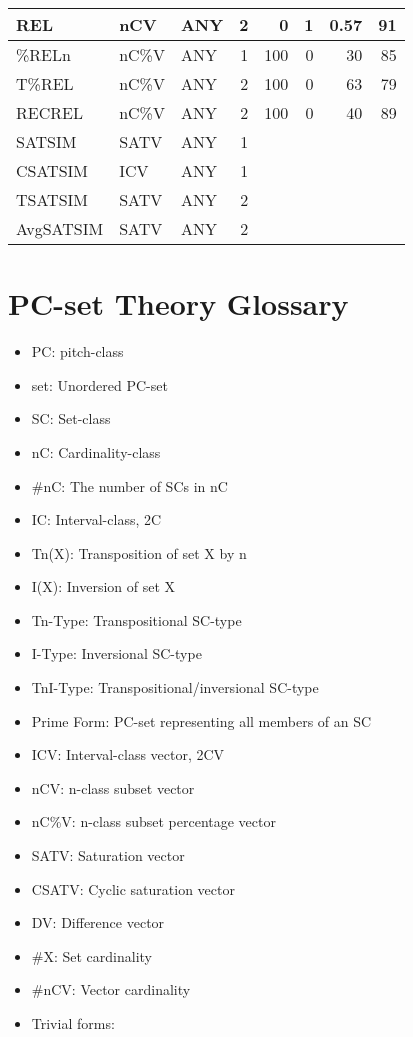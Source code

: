 \documentclass{article}
\begin{document}
\begin{table}[htb]
\begin{center}
\begin{tabular}{lllrrrrr}
 REL         &  nCV     &  ANY   &        2  &     0  &     1  &  0.57  &        91  \\
\hline
 \%RELn      &  nC\%V   &  ANY   &        1  &   100  &     0  &    30  &        85  \\
 T\%REL      &  nC\%V   &  ANY   &        2  &   100  &     0  &    63  &        79  \\
 RECREL      &  nC\%V   &  ANY   &        2  &   100  &     0  &    40  &        89  \\
\hline
 SATSIM      &  SATV    &  ANY   &        1  &        &        &        &            \\
 CSATSIM     &  ICV     &  ANY   &        1  &        &        &        &            \\
 TSATSIM     &  SATV    &  ANY   &        2  &        &        &        &            \\
 AvgSATSIM   &  SATV    &  ANY   &        2  &        &        &        &            \\
\hline
\end{tabular}
\end{center}
\end{table}
\section{PC-set Theory Glossary}
\label{sec-12}

\begin{itemize}
\item PC: pitch-class
\item set: Unordered PC-set
\item SC: Set-class
\item nC: Cardinality-class
\item \#nC: The number of SCs in nC
\item IC: Interval-class, 2C
\item Tn(X): Transposition of set X by n
\item I(X): Inversion of set X
\item Tn-Type: Transpositional SC-type
\item I-Type: Inversional SC-type
\item TnI-Type: Transpositional/inversional SC-type
\item Prime Form: PC-set representing all members of an SC
\item ICV: Interval-class vector, 2CV
\item nCV: n-class subset vector
\item nC\%V: n-class subset percentage vector
\item SATV: Saturation vector
\item CSATV: Cyclic saturation vector
\item DV: Difference vector
\item \#X: Set cardinality
\item \#nCV: Vector cardinality
\item Trivial forms:
\end{itemize}
\end{document}
